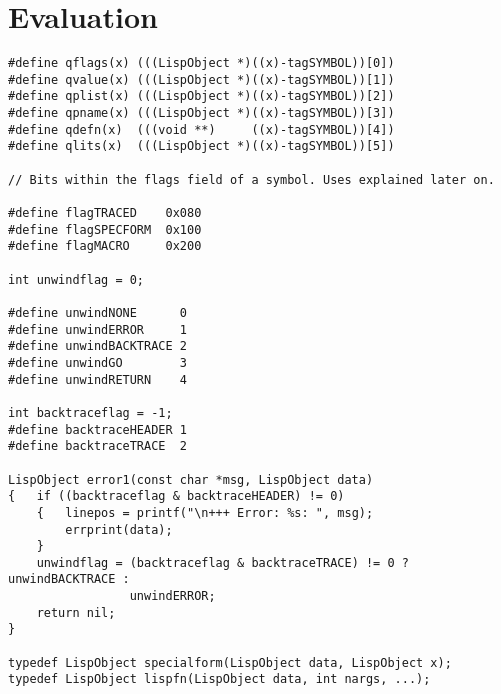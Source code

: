 \chapter{Evaluation}




{\small\begin{verbatim}
#define qflags(x) (((LispObject *)((x)-tagSYMBOL))[0])
#define qvalue(x) (((LispObject *)((x)-tagSYMBOL))[1])
#define qplist(x) (((LispObject *)((x)-tagSYMBOL))[2])
#define qpname(x) (((LispObject *)((x)-tagSYMBOL))[3])
#define qdefn(x)  (((void **)     ((x)-tagSYMBOL))[4])
#define qlits(x)  (((LispObject *)((x)-tagSYMBOL))[5])

// Bits within the flags field of a symbol. Uses explained later on.

#define flagTRACED    0x080
#define flagSPECFORM  0x100
#define flagMACRO     0x200

int unwindflag = 0;

#define unwindNONE      0
#define unwindERROR     1
#define unwindBACKTRACE 2
#define unwindGO        3
#define unwindRETURN    4

int backtraceflag = -1;
#define backtraceHEADER 1
#define backtraceTRACE  2

LispObject error1(const char *msg, LispObject data)
{   if ((backtraceflag & backtraceHEADER) != 0)
    {   linepos = printf("\n+++ Error: %s: ", msg);
        errprint(data);
    }
    unwindflag = (backtraceflag & backtraceTRACE) != 0 ? unwindBACKTRACE :
                 unwindERROR;
    return nil;
}

typedef LispObject specialform(LispObject data, LispObject x);
typedef LispObject lispfn(LispObject data, int nargs, ...);


\end{verbatim}}
